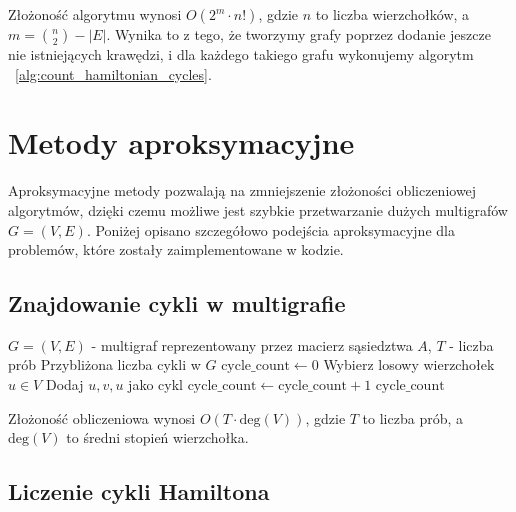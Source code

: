 Złożoność algorytmu wynosi \( O(2^m \cdot n!) \), gdzie \( n \) to liczba wierzchołków, a \(m = {n\choose 2} - \left| E \right|\). Wynika to z tego, że tworzymy grafy poprzez dodanie jeszcze nie istniejących krawędzi, i dla każdego takiego grafu wykonujemy algorytm ~\ref{alg:count_hamiltonian_cycles}.


\section{Metody aproksymacyjne}

Aproksymacyjne metody pozwalają na zmniejszenie złożoności obliczeniowej algorytmów, dzięki czemu możliwe jest szybkie przetwarzanie dużych multigrafów \( G = (V, E) \). Poniżej opisano szczegółowo podejścia aproksymacyjne dla problemów, które zostały zaimplementowane w kodzie.

\subsection{Znajdowanie cykli w multigrafie}

\begin{algorithm}[H]
\caption{Aproksymacyjne znajdowanie cykli w multigrafie}
\label{alg:approx_find_cycles}
\begin{algorithmic}[1]
\Require \( G = (V, E) \) - multigraf reprezentowany przez macierz sąsiedztwa \( A \), \( T \) - liczba prób
\Ensure Przybliżona liczba cykli w \( G \)
\State \( \text{cycle\_count} \gets 0 \)
    \State Wybierz losowy wierzchołek \( u \in V \)
            \State Dodaj \( u, v, u \) jako cykl
            \State \( \text{cycle\_count} \gets \text{cycle\_count} + 1 \)
        \EndIf
    \EndFor
\EndFor
\State \Return \( \text{cycle\_count} \)
\end{algorithmic}
\end{algorithm}

Złożoność obliczeniowa wynosi \( O(T \cdot \text{deg}(V)) \), gdzie \( T \) to liczba prób, a \( \text{deg}(V) \) to średni stopień wierzchołka.

\subsection{Liczenie cykli Hamiltona}

